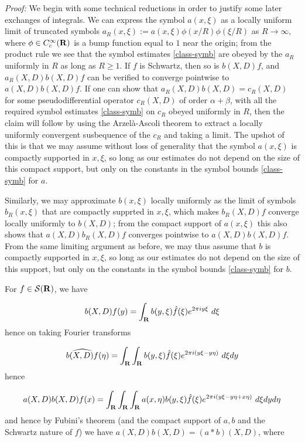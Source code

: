 \documentclass[11pt]{article}
\theoremstyle{definition}
\theoremstyle{remark}
\begin{document}
\emph{Proof:}  We begin with some technical reductions in order to justify some later exchanges of integrals. We can express the symbol \({a(x,\xi)}\) as a locally uniform limit of truncated symbols \({a_R(x,\xi) := a(x,\xi) \phi(x/R) \phi(\xi/R)}\) as \({R \rightarrow \infty}\), where \({\phi \in C^\infty_c({\bf R})}\) is a bump function equal to \({1}\) near the origin; from the product rule we see that the symbol estimates \eqref{class-symb} are obeyed by the \({a_R}\) uniformly in \({R}\) as long as \({R \geq 1}\). If \({f}\) is Schwartz, then so is \({b(X,D) f}\), and \({a_R(X,D) b(X,D) f}\) can be verified to converge pointwise to \({a(X,D) b(X,D) f}\). If one can show that \({a_R(X,D) b(X,D) = c_R(X,D)}\) for some pseudodifferential operator \({c_R(X,D)}\) of order \({\alpha+\beta}\), with all the required symbol estimates \eqref{class-symb} on \({c_R}\) obeyed uniformly in \({R}\), then the claim will follow by using the Arzelà-Ascoli theorem to extract a locally uniformly convergent susbequence of the \({c_R}\) and taking a limit. The upshot of this is that we may assume without loss of generality that the symbol \({a(x,\xi)}\) is compactly supported in \({x,\xi}\), so long as our estimates do not depend on the size of this compact support, but only on the constants in the symbol bounds \eqref{class-symb} for \({a}\).



Similarly, we may approximate \({b(x,\xi)}\) locally uniformly as the limit of symbols \({b_R(x,\xi)}\) that are compactly supprted in \({x,\xi}\), which makes \({b_R(X,D) f}\) converge locally uniformly to \({b(X,D)}\); from the compact support of \({a(x,\xi)}\) this also shows that \({a(X,D) b_R(X,D) f}\) converges pointwise to \({a(X,D) b(X,D) f}\). From the same limiting argument as before, we may thus assume that \({b}\) is compactly supported in \({x,\xi}\), so long as our estimates do not depend on the size of this support, but only on the constants in the symbol bounds \eqref{class-symb} for \({b}\).



For \({f \in {\mathcal S}({\bf R})}\), we have 

\[\displaystyle  b(X,D) f(y) = \int_{\bf R} b(y,\xi) \hat f(\xi) e^{2\pi i y \xi}\ d\xi\]
 hence on taking Fourier transforms 

\[\displaystyle  \widehat{b(X,D) f}(\eta) = \int_{\bf R} \int_{\bf R} b(y,\xi) \hat f(\xi) e^{2\pi i (y \xi- y\eta)}\ d\xi dy\]
 hence 

\[\displaystyle  a(X,D) b(X,D) f(x) = \int_{\bf R} \int_{\bf R} \int_{\bf R} a(x,\eta) b(y,\xi) \hat f(\xi) e^{2\pi i (y \xi-y\eta + x \eta)}\ d\xi dy d\eta\]
 and hence by Fubini’s theorem (and the compact support of \({a,b}\) and the Schwartz nature of \({f}\)) we have \({a(X,D) b(X,D) = (a \ast b)(X,D)}\), where \label{ast-def}
\end{document}
